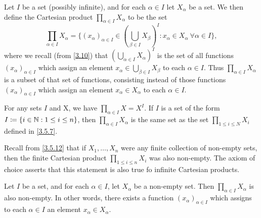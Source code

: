 \begin{defn}\label{8.4.1}
  Let \(I\) be a set (possibly infinite), and for each \(\alpha \in I\) let \(X_{\alpha}\) be a set.
  We then define the Cartesian product \(\prod_{\alpha \in I} X_{\alpha}\) to be the set
  \[
    \prod_{\alpha \in I} X_{\alpha} = \Bigg\{(x_{\alpha})_{\alpha \in I} \in (\bigcup_{\beta \in I} X_{\beta})^I : x_{\alpha} \in X_{\alpha} \ \forall \alpha \in I\Bigg\},
  \]
  where we recall (from \cref{3.10}) that \((\bigcup_{\alpha \in I} X_{\alpha})^I\) is the set of all functions \((x_{\alpha})_{\alpha \in I}\) which assign an element \(x_{\alpha} \in \bigcup_{\beta \in I} X_{\beta}\) to each \(\alpha \in I\).
  Thus \(\prod_{\alpha \in I} X_{\alpha}\) is a subset of that set of functions, consisting instead of those functions \((x_{\alpha})_{\alpha \in I}\) which assign an element \(x_{\alpha} \in X_{\alpha}\) to each \(\alpha \in I\).
\end{defn}

\begin{eg}\label{8.4.2}
  For any sets \(I\) and X, we have \(\prod_{\alpha \in I} X = X^I\).
  If \(I\) is a set of the form \(I \coloneqq \{i \in \mathbb{N} : 1 \leq i \leq n\}\), then \(\prod_{\alpha \in I} X_{\alpha}\) is the same set as the set \(\prod_{1 \leq i \leq N} X_i\) defined in \cref{3.5.7}.
\end{eg}

\begin{note}
  Recall from \cref{3.5.12} that if \(X_1, \dots, X_n\) were any finite collection of non-empty sets, then the finite Cartesian product \(\prod_{1 \leq i \leq n} X_i\) was also non-empty.
  The axiom of choice asserts that this statement is also true fo infinite Cartesian products.
\end{note}

\begin{ax}[Choice]\label{8.1}
  Let \(I\) be a set, and for each \(\alpha \in I\), let \(X_{\alpha}\) be a non-empty set.
  Then \(\prod_{\alpha \in I} X_{\alpha}\) is also non-empty.
  In other words, there exists a function \((x_{\alpha})_{\alpha \in I}\) which assigns to each \(\alpha \in I\) an element \(x_{\alpha} \in X_{\alpha}\).
\end{ax}

